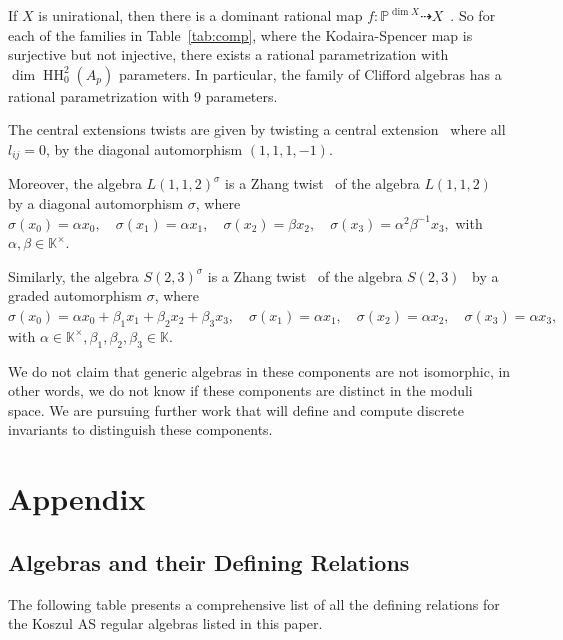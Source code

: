 \documentclass{amsart}
\def\HH{\operatorname{HH}}
\begin{document}
\begin{remark} If $X$ is unirational, then there is a dominant rational map $f: \mathbb{P}^{\dim X} \dashrightarrow X$~\cite[Prop.~1.1]{unirational}.
So for each of the families in Table~\ref{tab:comp}, where the Kodaira-Spencer map is surjective but not injective, there exists a rational parametrization with $\dim \HH^2_0(A_p)$ parameters.  In particular, the family of Clifford algebras has a rational parametrization with 9 parameters.
\end{remark}

\begin{remark}\label{CentralExtensionTwistands23Twist}
The central extensions twists are given by twisting a central extension~\cite[Equation~1.1]{MR1429334} where all $l_{ij}=0$, by the diagonal automorphism $(1,1,1,-1)$.

Moreover, the algebra \( L(1,1,2)^\sigma \) is a Zhang twist~\cite{TG96} of the algebra \( L(1,1,2) \)~\cite[Section 3.2]{MR3366864} by a diagonal automorphism \( \sigma \), where \\
$
\sigma(x_0) = \alpha x_0, \quad \sigma(x_1) = \alpha x_1, \quad \sigma(x_2) = \beta x_2, \quad \sigma(x_3) = \alpha^2\beta^{-1}x_3,
$
with \( \alpha, \beta \in \mathbb{K}^\times \).


Similarly, the algebra \( S(2,3)^\sigma \) is a Zhang twist~\cite{TG96} of the algebra \( S(2,3) \)~\cite[Section 3.5]{MR3366864} by a graded automorphism \( \sigma \), where \\ 
$
\sigma(x_0) = \alpha x_0 + \beta_1 x_1 + \beta_2 x_2 + \beta_3 x_3, \quad
\sigma(x_1) = \alpha x_1, \quad
\sigma(x_2) = \alpha x_2, \quad
\sigma(x_3) = \alpha x_3,
$
with \( \alpha \in \mathbb{K}^\times, \beta_1, \beta_2, \beta_3 \in \mathbb{K} \).
\end{remark}


\begin{remark}
    We do not claim that generic algebras in these components are not isomorphic, in other words, we do not know if these components are distinct in the moduli space. We are pursuing further work that will define and compute discrete invariants to distinguish these components.
\end{remark}


\section{Appendix}
\subsection{Algebras and their Defining Relations}
The following table presents a comprehensive list of all the defining relations for the Koszul AS regular algebras listed in this paper.  
\end{document}
